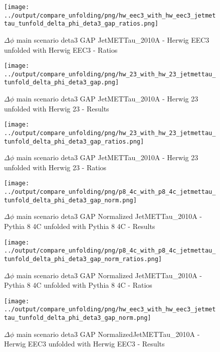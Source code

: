 \documentclass[11pt]{book}
\begin{document}
\begin{figure}[ht]
\centering
\texttt{[image: ../output/compare\_unfolding/png/hw\_eec3\_with\_hw\_eec3\_jetmettau\_tunfold\_delta\_phi\_deta3\_gap\_ratios.png]}
\caption{$\Delta\phi$ main scenario deta3 GAP JetMETTau\_2010A - Herwig EEC3 unfolded with Herwig EEC3 - Ratios}
\label{hw_eec3_hw_eec3_jetmettau_tunfold_delta_phi_deta3_gap_b}
\end{figure}

\begin{figure}[ht]
\centering
\texttt{[image: ../output/compare\_unfolding/png/hw\_23\_with\_hw\_23\_jetmettau\_tunfold\_delta\_phi\_deta3\_gap.png]}
\caption{$\Delta\phi$ main scenario deta3 GAP JetMETTau\_2010A - Herwig 23 unfolded with Herwig 23 - Results}
\label{hw_23_hw_23_jetmettau_tunfold_delta_phi_deta3_gap_a}
\end{figure}

\begin{figure}[ht]
\centering
\texttt{[image: ../output/compare\_unfolding/png/hw\_23\_with\_hw\_23\_jetmettau\_tunfold\_delta\_phi\_deta3\_gap\_ratios.png]}
\caption{$\Delta\phi$ main scenario deta3 GAP JetMETTau\_2010A - Herwig 23 unfolded with Herwig 23 - Ratios}
\label{hw_23_hw_23_jetmettau_tunfold_delta_phi_deta3_gap_b}
\end{figure}

\begin{figure}[ht]
\centering
\texttt{[image: ../output/compare\_unfolding/png/p8\_4c\_with\_p8\_4c\_jetmettau\_tunfold\_delta\_phi\_deta3\_gap\_norm.png]}
\caption{$\Delta\phi$ main scenario deta3 GAP Normalized JetMETTau\_2010A - Pythia 8 4C unfolded with Pythia 8 4C - Results}
\label{p8_p8_jetmettau_tunfold_delta_phi_deta3_gap_norm_a}
\end{figure}

\begin{figure}[ht]
\centering
\texttt{[image: ../output/compare\_unfolding/png/p8\_4c\_with\_p8\_4c\_jetmettau\_tunfold\_delta\_phi\_deta3\_gap\_norm\_ratios.png]}
\caption{$\Delta\phi$ main scenario deta3 GAP Normalized JetMETTau\_2010A - Pythia 8 4C unfolded with Pythia 8 4C - Ratios}
\label{p8_p8_jetmettau_tunfold_delta_phi_deta3_gap_norm_b}
\end{figure}

\begin{figure}[ht]
\centering
\texttt{[image: ../output/compare\_unfolding/png/hw\_eec3\_with\_hw\_eec3\_jetmettau\_tunfold\_delta\_phi\_deta3\_gap\_norm.png]}
\caption{$\Delta\phi$ main scenario deta3 GAP NormalizedJetMETTau\_2010A - Herwig EEC3 unfolded with Herwig EEC3 - Results}
\label{hw_eec3_hw_eec3_jetmettau_tunfold_delta_phi_deta3_gap_norm_a}
\end{figure}
\end{document}

